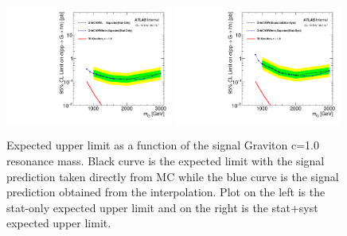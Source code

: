 \begin{figure}[!h]
\begin{center}
\includegraphics*[width=0.49\textwidth]{./figures/boosted/SigInterpolation/Limits_GravitonC10RW_MCvsInterpolation_StatOnly}
\includegraphics*[width=0.49\textwidth]{./figures/boosted/SigInterpolation/Limits_GravitonC10RW_MCvsInterpolation_Systs}
\caption{Expected upper limit as a function of the signal Graviton c=1.0 resonance mass. Black curve is the expected
limit with the signal prediction taken directly from MC while the blue curve is the signal prediction obtained from the interpolation.
Plot on the left is the stat-only expected upper limit and on the right is the stat+syst expected upper limit.}
\label{fig:boosted_siginter_templates_limits_c10}
\end{center}
\end{figure}
\FloatBarrier


  
